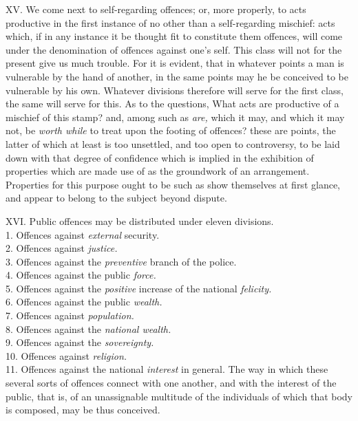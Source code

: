 \documentclass[12pt]{report}
\begin{document}
XV. We come next to self-regarding offences; or, more properly, to acts
productive in the first instance of no other than a self-regarding
mischief: acts which, if in any instance it be thought fit to constitute
them offences, will come under the denomination of offences against
one's self. This class will not for the present give us much trouble.
For it is evident, that in whatever points a man is vulnerable by the
hand of another, in the same points may he be conceived to be vulnerable
by his own. Whatever divisions therefore will serve for the first class,
the same will serve for this. As to the questions, What acts are
productive of a mischief of this stamp? and, among such as \emph{are,}
which it may, and which it may not, be \emph{worth while} to treat upon
the footing of offences? these are points, the latter of which at least
is too unsettled, and too open to controversy, to be laid down with that
degree of confidence which is implied in the exhibition of properties
which are made use of as the groundwork of an arrangement. Properties
for this purpose ought to be such as show themselves at first glance,
and appear to belong to the subject beyond dispute.

XVI. Public offences may be distributed under eleven divisions.\\
1. Offences against \emph{external} security.\\
2. Offences against \emph{justice.}\\
3. Offences against the \emph{preventive} branch of the police.\\
4. Offences against the public \emph{force.}\\
5. Offences against the \emph{positive} increase of the national
\emph{felicity.}\\
6. Offences against the public \emph{wealth.}\\
7. Offences against \emph{population.}\\
8. Offences against the \emph{national wealth.}\\
9. Offences against the \emph{sovereignty.}\\
10. Offences against \emph{religion.}\\
11. Offences against the national \emph{interest} in general. The way in
which these several sorts of offences connect with one another, and with
the interest of the public, that is, of an unassignable multitude of the
individuals of which that body is composed, may be thus conceived.
\end{document}
